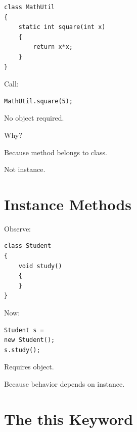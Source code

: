 \documentclass[11pt,a4paper]{book}
\begin{document}
\begin{verbatim}
class MathUtil
{
    static int square(int x)
    {
        return x*x;
    }
}
\end{verbatim}


Call:

\begin{verbatim}
MathUtil.square(5);
\end{verbatim}


No object required.


Why?


Because method belongs to class.


Not instance.


\section{Instance Methods}

Observe:

\begin{verbatim}
class Student
{
    void study()
    {
    }
}
\end{verbatim}


Now:

\begin{verbatim}
Student s =
new Student();
s.study();
\end{verbatim}


Requires object.


Because behavior depends on instance.


\section{The this Keyword}
\end{document}
